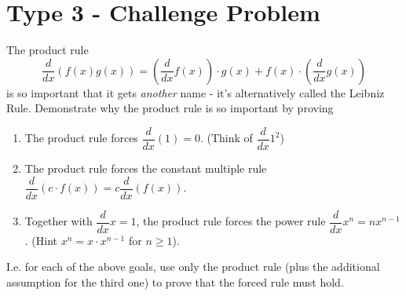 \documentclass[12pt]{article}
\begin{document}
\section{Type 3 - Challenge Problem}
The product rule
\begin{equation}
  \dfrac{d}{dx}(f(x)g(x)) = (\dfrac{d}{dx} f(x)) \cdot g(x) + f(x) \cdot (\dfrac{d}{dx} g(x))
\end{equation}
is so important that it gets \textit{another} name - it's alternatively called the Leibniz Rule.
Demonstrate why the product rule is so important by proving
\begin{enumerate}
  \item The product rule forces $\dfrac{d}{dx} (1) = 0$. (Think of $\dfrac{d}{dx} 1^2$)
  \item The product rule forces the constant multiple rule $\dfrac{d}{dx} (c \cdot f(x)) = c \dfrac{d}{dx} (f(x))$.
  \item Together with $\dfrac{d}{dx} x = 1$, the product rule forces the power rule $\dfrac{d}{dx} x^n = n x^{n - 1}$. (Hint $x^n = x \cdot x^{n - 1}$ for $n \geq 1$).
\end{enumerate}

I.e. for each of the above goals, use only the product rule (plus the additional assumption for the third one) to prove that the forced rule must hold. 



\end{document}
